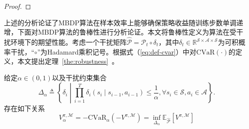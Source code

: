 \begin{proof}
\end{proof}

上述的分析论证了MBDP算法在样本效率上能够确保策略收益随训练步数单调递增，下面对MBDP算法的鲁棒性进行分析论证。本文将鲁棒性定义为算法在受干扰环境下的期望性能。考虑一个干扰矩阵$\hat{\mathcal{P}}=\mathcal{P}_t \circ \delta_t$，其中$\delta_t\in\mathbb{R}^{\mathcal{S}\times\mathcal{A}\times\mathcal{S}}$为可积概率干扰，“$\circ$”为Hadamard乘积记号。根据式（\ref{eq:def-cvar}）中对$\mathrm{CVaR}(\cdot)$的定义，本文提出定理~\ref{the:robustness}~。

\begin{theorem}\label{the:robustness}
给定$\alpha\in(0,1)$以及干扰约束集合
\begin{equation}\label{eq:supp-perturbation}
    \Delta_\alpha \triangleq \left\{\delta_i\middle\vert\prod_{i=1}^{T}\delta_i(s_i\mid s_{i-1},a_{i-1})\leq \frac{1}{\alpha}, \forall s_i\in\mathcal{S}, a_i\in\mathcal{A}\right\}.
\end{equation}
存在如下关系
\begin{equation}\label{eq:return-cvar-rob}
    V_\alpha^{\pi,\mathcal{M}} = -\mathrm{CVaR}_\alpha\left(-V^{\pi,\mathcal{M}}\right)=\inf\limits_{\Delta_\alpha}\mathbb{E}_{\hat{\mathcal{P}}}\left[V^{\pi,\mathcal{M}}\right]
\end{equation}
\end{theorem}

